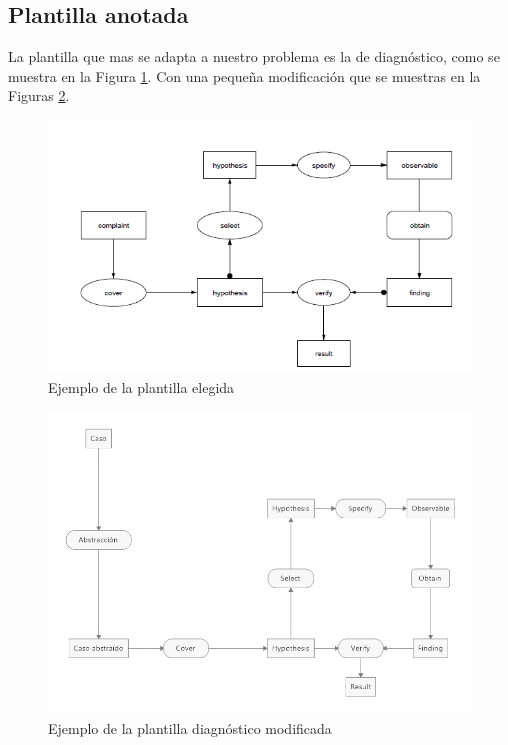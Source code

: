 \subsection{Plantilla anotada}

La plantilla que mas se adapta a nuestro problema es la de diagnóstico, como se muestra en la Figura \ref{fig:PlantillaEjemplo}. Con una pequeña modificación que se muestras en la Figuras \ref{fig:PlantillaDiagnosticoModificada}.

\begin{figure}[H]
  \centering
  \includegraphics[scale=0.90]{imagenes/PlantillaEjemplo.png}
  \caption{\label{fig:PlantillaEjemplo}Ejemplo de la plantilla elegida}
\end{figure}

\begin{figure}[H]
  \centering
  \includegraphics[scale=2.10]{imagenes/PlantillaDiagnosticoModificada.png}
  \caption{\label{fig:PlantillaDiagnosticoModificada}Ejemplo de la plantilla diagnóstico modificada}
\end{figure}

